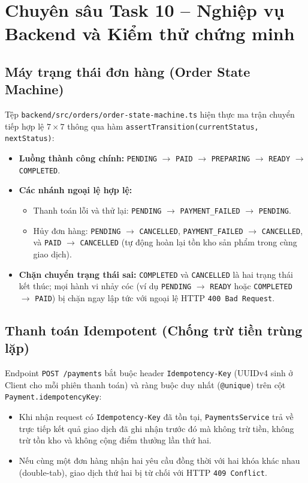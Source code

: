 \documentclass[a4paper,12pt]{article}
\begin{document}
\newpage
\section{Chuyên sâu Task 10 -- Nghiệp vụ Backend và Kiểm thử chứng minh}

\subsection{Máy trạng thái đơn hàng (Order State Machine)}
Tệp \texttt{backend/src/orders/order-state-machine.ts} hiện thực ma trận chuyển tiếp hợp lệ $7 \times 7$ thông qua hàm \texttt{assertTransition(currentStatus, nextStatus)}:
\begin{itemize}
  \item \textbf{Luồng thành công chính:} \texttt{PENDING} $\rightarrow$ \texttt{PAID} $\rightarrow$ \texttt{PREPARING} $\rightarrow$ \texttt{READY} $\rightarrow$ \texttt{COMPLETED}.
  \item \textbf{Các nhánh ngoại lệ hợp lệ:}
    \begin{itemize}
      \item Thanh toán lỗi và thử lại: \texttt{PENDING} $\rightarrow$ \texttt{PAYMENT\_FAILED} $\rightarrow$ \texttt{PENDING}.
      \item Hủy đơn hàng: \texttt{PENDING} $\rightarrow$ \texttt{CANCELLED}, \texttt{PAYMENT\_FAILED} $\rightarrow$ \texttt{CANCELLED}, và \texttt{PAID} $\rightarrow$ \texttt{CANCELLED} (tự động hoàn lại tồn kho sản phẩm trong cùng giao dịch).
    \end{itemize}
  \item \textbf{Chặn chuyển trạng thái sai:} \texttt{COMPLETED} và \texttt{CANCELLED} là hai trạng thái kết thúc; mọi hành vi nhảy cóc (ví dụ \texttt{PENDING} $\rightarrow$ \texttt{READY} hoặc \texttt{COMPLETED} $\rightarrow$ \texttt{PAID}) bị chặn ngay lập tức với ngoại lệ HTTP \texttt{400 Bad Request}.
\end{itemize}

\subsection{Thanh toán Idempotent (Chống trừ tiền trùng lặp)}
Endpoint \texttt{POST /payments} bắt buộc header \texttt{Idempotency-Key} (UUIDv4 sinh ở Client cho mỗi phiên thanh toán) và ràng buộc duy nhất (\texttt{@unique}) trên cột \texttt{Payment.idempotencyKey}:
\begin{itemize}
  \item Khi nhận request có \texttt{Idempotency-Key} đã tồn tại, \texttt{PaymentsService} trả về trực tiếp kết quả giao dịch đã ghi nhận trước đó mà không trừ tiền, không trừ tồn kho và không cộng điểm thưởng lần thứ hai.
  \item Nếu cùng một đơn hàng nhận hai yêu cầu đồng thời với hai khóa khác nhau (double-tab), giao dịch thứ hai bị từ chối với HTTP \texttt{409 Conflict}.
\end{itemize}
\end{document}
